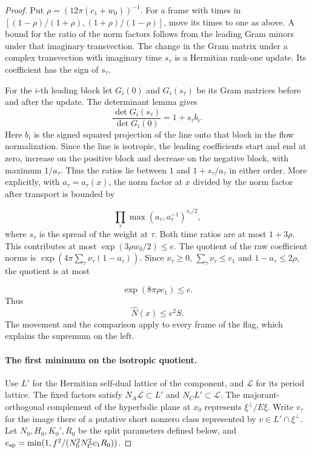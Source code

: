 \begin{proof}
Put \(\rho=(12\pi(c_1+w_0))^{-1}\).
For a frame with times in
\([(1-\rho)/(1+\rho),(1+\rho)/(1-\rho)]\), move its times to one
as above. A bound for the ratio of the norm factors follows
from the leading Gram minors under that imaginary transvection.
The change in the Gram matrix under a complex transvection
with imaginary time \(s_\tau\) is a Hermitian rank-one
update. Its coefficient has the sign of \(s_\tau\).

For the \(i\)-th leading block let \(G_i(0)\) and \(G_i(s_\tau)\) be its Gram matrices before and after the update. The determinant lemma gives
\[
  \frac{\det G_i(s_\tau)}{\det G_i(0)}=1+s_\tau b_i.
\]
 Here \(b_i\) is the signed squared projection
of the line onto that block in the flow normalization.
Since the line is isotropic, the leading coefficients start
and end at zero, increase on the positive block and decrease
on the negative block, with maximum \(1/a_\tau\).
Thus the ratios lie between \(1\) and \(1+s_\tau/a_\tau\)
in either order.
More explicitly, with \(a_\tau=a_\tau(x)\), the norm factor at
\(x\) divided by the norm factor after transport is bounded by

\[
  \prod_\tau\max(a_\tau,a_\tau^{-1})^{s_\tau/2},
\]
 where
\(s_\tau\) is the spread of the weight at \(\tau\). Both time
ratios are at most \(1+3\rho\). This contributes at most
\(\exp(3\rho w_0/2)\le e\).
The quotient of the raw coefficient norms is
\(\exp(4\pi\sum_\tau \nu_\tau(1-a_\tau))\).
Since \(\nu_\tau\ge0\), \(\sum_\tau\nu_\tau\le c_1\) and
\(1-a_\tau\le2\rho\), the quotient is at most

\[
  \exp(8\pi\rho c_1)\le e.
\]
 Thus
\begin{equation}\label{eq:slice-split-near-sup}
  \widehat N(x)\le e^2 S .
\end{equation}
The movement and the comparison apply to every frame of the flag,
which explains the supremum on the left.

\paragraph{The first minimum on the isotropic quotient.}
Use \(L'\) for the Hermitian self-dual lattice of the component,
and \(\mathcal L\) for its period lattice. The fixed factors satisfy
\(N_A\mathcal L\subset L'\) and \(N_C L'\subset\mathcal L\). The
majorant-orthogonal complement of the hyperbolic plane at \(x_0\)
represents \(\xi^\perp/E\xi\). Write \(v_\tau\) for the image there
of a putative short nonzero class represented by \(v\in L'\cap\xi^\perp\).
Let \(N_0,H_0,K_0',R_0\) be the split parameters defined below, and
\(e_{\rm sp}=\min(1,f^2/(N_0^2 N_C^2 c_1 R_0))\).


\end{proof}
